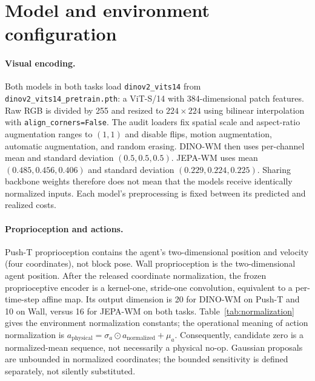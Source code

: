 \section{Model and environment configuration}
\label{app:config}

\paragraph{Visual encoding.}
Both models in both tasks load \texttt{dinov2\_vits14} from
\texttt{dinov2\_vits14\_pretrain.pth}: a ViT-S/14 with 384-dimensional patch
features. Raw RGB is divided by 255 and resized to $224\times224$ using
bilinear interpolation with \texttt{align\_corners=False}. The audit loaders
fix spatial scale and aspect-ratio augmentation ranges to $(1,1)$ and disable
flips, motion augmentation, automatic augmentation, and random erasing.
DINO-WM then uses per-channel mean and standard deviation $(0.5,0.5,0.5)$.
JEPA-WM uses mean $(0.485,0.456,0.406)$ and standard deviation
$(0.229,0.224,0.225)$. Sharing backbone weights therefore does not mean that
the models receive identically normalized inputs. Each model's preprocessing
is fixed between its predicted and realized costs.

\paragraph{Proprioception and actions.}
Push-T proprioception contains the agent's two-dimensional position and
velocity (four coordinates), not block pose. Wall proprioception is the
two-dimensional agent position. After the released coordinate normalization,
the frozen proprioceptive encoder is a kernel-one, stride-one convolution,
equivalent to a per-time-step affine map. Its output dimension is 20 for
DINO-WM on Push-T and 10 on Wall, versus 16 for JEPA-WM on both tasks.
Table~\ref{tab:normalization} gives the environment normalization constants;
the operational meaning of action normalization is
$a_{\mathrm{physical}}=\sigma_a\odot a_{\mathrm{normalized}}+\mu_a$.
Consequently, candidate zero is a normalized-mean sequence, not necessarily
a physical no-op. Gaussian proposals are unbounded in normalized coordinates;
the bounded sensitivity is defined separately, not silently substituted.

